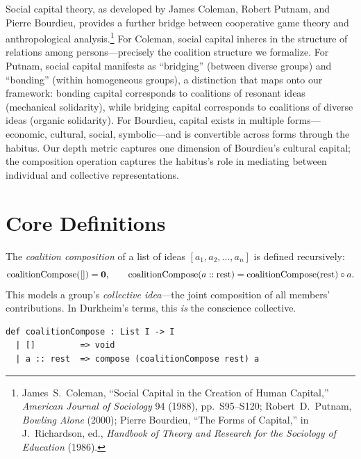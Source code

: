 Social capital theory, as developed by James Coleman, Robert Putnam, and
Pierre Bourdieu, provides a further bridge between cooperative game theory
and anthropological analysis.\footnote{James~S.\ Coleman, ``Social Capital
in the Creation of Human Capital,'' \textit{American Journal of Sociology}
94 (1988), pp.\ S95--S120; Robert~D.\ Putnam, \textit{Bowling Alone}
(2000); Pierre Bourdieu, ``The Forms of Capital,'' in J.~Richardson, ed.,
\textit{Handbook of Theory and Research for the Sociology of Education}
(1986).}  For Coleman, social capital inheres in the structure of
relations among persons---precisely the coalition structure we formalize.
For Putnam, social capital manifests as ``bridging'' (between diverse
groups) and ``bonding'' (within homogeneous groups), a distinction that maps
onto our framework: bonding capital corresponds to coalitions of resonant
ideas (mechanical solidarity), while bridging capital corresponds to
coalitions of diverse ideas (organic solidarity).  For Bourdieu, capital
exists in multiple forms---economic, cultural, social, symbolic---and is
convertible across forms through the habitus.  Our depth metric captures
one dimension of Bourdieu's cultural capital; the composition operation
captures the habitus's role in mediating between individual and collective
representations.

\section{Core Definitions}
\label{sec:ch13-defs}

\begin{definition}
\label{def:coalition-compose}
The \emph{coalition composition} of a list of ideas $[a_1, a_2, \dots, a_n]$
is defined recursively:
\[
  \operatorname{coalitionCompose}([]) = \mathbf{0}, \qquad
  \operatorname{coalitionCompose}(a :: \text{rest}) =
    \operatorname{coalitionCompose}(\text{rest}) \circ a.
\]
This models a group's \emph{collective idea}---the joint composition of all
members' contributions.  In Durkheim's terms, this \emph{is} the conscience
collective.
\end{definition}

\begin{lstlisting}[caption={Coalition composition in Lean~4}]
def coalitionCompose : List I -> I
  | []         => void
  | a :: rest  => compose (coalitionCompose rest) a
\end{lstlisting}

